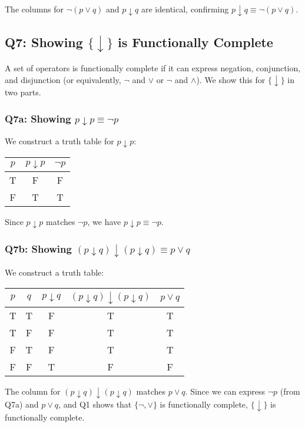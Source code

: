 \documentclass[12pt]{article}
\begin{document}
The columns for $\neg(p \vee q)$ and $p \downarrow q$ are identical, confirming $p \downarrow q \equiv \neg(p \vee q)$.

\subsection*{Q7: Showing $\{\downarrow\}$ is Functionally Complete}
A set of operators is functionally complete if it can express negation, conjunction, and disjunction (or equivalently, $\neg$ and $\vee$ or $\neg$ and $\wedge$). We show this for $\{\downarrow\}$ in two parts.

\subsubsection*{Q7a: Showing $p \downarrow p \equiv \neg p$}
We construct a truth table for $p \downarrow p$:

\begin{center}
\begin{tabular}{c|cc}
\toprule
$p$ & $p \downarrow p$ & $\neg p$ \\
\midrule
T & F & F \\
F & T & T \\
\bottomrule
\end{tabular}
\end{center}

Since $p \downarrow p$ matches $\neg p$, we have $p \downarrow p \equiv \neg p$.

\subsubsection*{Q7b: Showing $(p \downarrow q) \downarrow (p \downarrow q) \equiv p \vee q$}
We construct a truth table:

\begin{center}
\begin{tabular}{cc|ccc}
\toprule
$p$ & $q$ & $p \downarrow q$ & $(p \downarrow q) \downarrow (p \downarrow q)$ & $p \vee q$ \\
\midrule
T & T & F & T & T \\
T & F & F & T & T \\
F & T & F & T & T \\
F & F & T & F & F \\
\bottomrule
\end{tabular}
\end{center}

The column for $(p \downarrow q) \downarrow (p \downarrow q)$ matches $p \vee q$. Since we can express $\neg p$ (from Q7a) and $p \vee q$, and Q1 shows that $\{\neg, \vee\}$ is functionally complete, $\{\downarrow\}$ is functionally complete.
\end{document}
